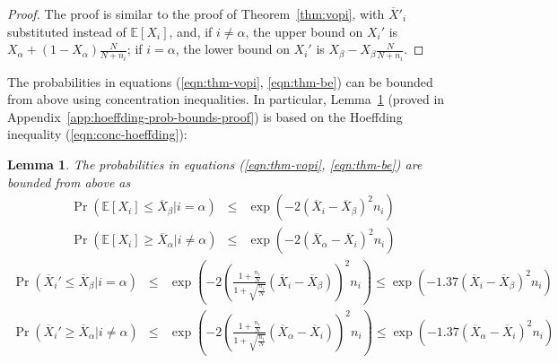 \documentclass{article}
\newcommand {\IE} {\ensuremath {\mathbb{E}}}
\newtheorem{lmm}{Lemma}
\begin{document}
\begin{proof}
The proof is similar to the proof of Theorem~\ref{thm:vopi}, with
$\overline X'_i$ substituted instead of $\IE[X_i]$, and, if
$i\ne\alpha$, the upper bound on $X_i'$ is $X_\alpha+(1-X_\alpha)
\frac N {N+n_i}$; if $i=\alpha$, the lower bound on $X_i'$ is
$X_\beta - X_\beta \frac N {N+n_i}$.
\end{proof}

The probabilities in equations (\ref{eqn:thm-vopi}, \ref{eqn:thm-be})
can be bounded from above using concentration inequalities. In
particular, Lemma~\ref{lemma:hoeffding-prob-bounds} (proved in 
Appendix~\ref{app:hoeffding-prob-bounds-proof}) is based on the
Hoeffding inequality (\ref{eqn:conc-hoeffding}):
\begin{lmm} The probabilities in equations (\ref{eqn:thm-vopi},
\ref{eqn:thm-be}) are bounded from above as
\begin{eqnarray}
\Pr(\IE[X_i] \le \overline X_\beta|i=\alpha)&
   \le & \exp(-2 (\overline X_i - \overline X_\beta)^2 n_i)\nonumber\\
\Pr(\IE[X_i] \ge \overline X_\alpha|i\ne\alpha)&
   \le & \exp(-2 (\overline X_\alpha - \overline X_i)^2 n_i)
\label{eqn:probound-perf-hoeffding}
\end{eqnarray}
\vspace{-1.5\baselineskip}
\begin{eqnarray}
\Pr(\overline X_i' \le \overline X_\beta|i=\alpha) &
   \le & \exp\left(- 2\left(\frac {1+\frac {n_i} N} {1+\sqrt {\frac {n_i} N}}(\overline X_i - \overline X_\beta)\right)^2 n_i \right)
   \le \exp\left(- 1.37(\overline X_i - \overline X_\beta)^2 n_i \right) \nonumber\\
\Pr(\overline X_i' \ge \overline X_\alpha|i\ne\alpha) &
   \le & \exp\left(- 2\left(\frac {1+\frac {n_i} N} {1+\sqrt {\frac {n_i} N}} (\overline X_\alpha - \overline X_i)\right)^2 n_i \right)
    \le \exp\left(- 1.37(\overline X_\alpha - \overline X_i)^2 n_i \right)
\label{eqn:probound-blnk-hoeffding}
\end{eqnarray}
\label{lemma:hoeffding-prob-bounds}
\end{lmm}
\end{document}
